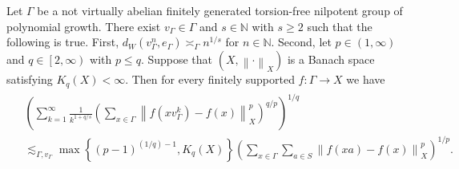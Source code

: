\documentclass[10pt,a4paper]{amsart}
\begin{document}
\begin{lemma}\label{lem:pq-global}
Let $\Gamma$ be a not virtually abelian finitely generated torsion-free nilpotent group of polynomial growth. There exist $v_\Gamma\in \Gamma$ and $s\in \mathbb{N}$ with $s\ge 2$ such that the following is true. First, $d_W\left(v_\Gamma^n,e_\Gamma\right)\asymp_\Gamma n^{1/s}$ for $n\in \mathbb{N}$. Second, let $p\in \left(1,\infty\right)$ and $q\in \left[2,\infty\right)$ with $p\le q$. Suppose that $\left(X,\left\|\cdot\right\|_X\right)$ is a Banach space satisfying $K_q\left(X\right)<\infty$.  Then for every finitely supported $f:\Gamma\to X$ we have
\begin{align*}
\begin{aligned}
&\left(\sum_{k=1}^{\infty}\frac{1}{k^{1+q/s}}\left(\sum_{x\in \Gamma} \left\|f\left(xv_\Gamma^k\right)-f\left(x\right)\right\|_X^p\right)^{q/p}\right)^{1/q}\\
&\lesssim_{\Gamma,v_\Gamma} \max\left\{\left(p-1\right)^{(1/q)-1},K_q\left(X\right)\right\} 
\left(\sum_{x\in \Gamma} \sum_{a\in S}\left\|f\left(xa\right)-f\left(x\right)\right\|^p_X\right)^{1/p}.
\end{aligned}
\end{align*}
\end{lemma}
\end{document}
